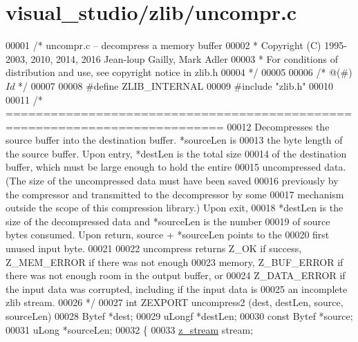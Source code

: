 \hypertarget{visual__studio_2zlib_2uncompr_8c_source}{}\section{visual\+\_\+studio/zlib/uncompr.c}
\label{visual__studio_2zlib_2uncompr_8c_source}

\begin{DoxyCode}
00001 \textcolor{comment}{/* uncompr.c -- decompress a memory buffer}
00002 \textcolor{comment}{ * Copyright (C) 1995-2003, 2010, 2014, 2016 Jean-loup Gailly, Mark Adler}
00003 \textcolor{comment}{ * For conditions of distribution and use, see copyright notice in zlib.h}
00004 \textcolor{comment}{ */}
00005 
00006 \textcolor{comment}{/* @(#) $Id$ */}
00007 
00008 \textcolor{preprocessor}{#define ZLIB\_INTERNAL}
00009 \textcolor{preprocessor}{#include "zlib.h"}
00010 
00011 \textcolor{comment}{/* ===========================================================================}
00012 \textcolor{comment}{     Decompresses the source buffer into the destination buffer.  *sourceLen is}
00013 \textcolor{comment}{   the byte length of the source buffer. Upon entry, *destLen is the total size}
00014 \textcolor{comment}{   of the destination buffer, which must be large enough to hold the entire}
00015 \textcolor{comment}{   uncompressed data. (The size of the uncompressed data must have been saved}
00016 \textcolor{comment}{   previously by the compressor and transmitted to the decompressor by some}
00017 \textcolor{comment}{   mechanism outside the scope of this compression library.) Upon exit,}
00018 \textcolor{comment}{   *destLen is the size of the decompressed data and *sourceLen is the number}
00019 \textcolor{comment}{   of source bytes consumed. Upon return, source + *sourceLen points to the}
00020 \textcolor{comment}{   first unused input byte.}
00021 \textcolor{comment}{}
00022 \textcolor{comment}{     uncompress returns Z\_OK if success, Z\_MEM\_ERROR if there was not enough}
00023 \textcolor{comment}{   memory, Z\_BUF\_ERROR if there was not enough room in the output buffer, or}
00024 \textcolor{comment}{   Z\_DATA\_ERROR if the input data was corrupted, including if the input data is}
00025 \textcolor{comment}{   an incomplete zlib stream.}
00026 \textcolor{comment}{*/}
00027 \textcolor{keywordtype}{int} ZEXPORT uncompress2 (dest, destLen, source, sourceLen)
00028     Bytef *dest;
00029     uLongf *destLen;
00030     \textcolor{keyword}{const} Bytef *source;
00031     uLong *sourceLen;
00032 \{
00033     \hyperlink{structz__stream__s}{z\_stream} stream;

\end{DoxyCode}
